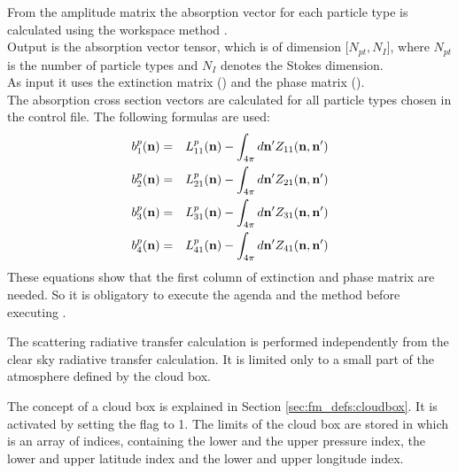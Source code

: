 From the amplitude matrix the absorption vector for each
particle type is calculated using the workspace method
.\\
Output is the absorption vector tensor, which is  of  dimension
[$N_{pt}, N_{I}$], where $N_{pt}$ is the number of particle
types  and $N_{I}$ denotes the Stokes dimension.\\
As input it uses the extinction
matrix () and the phase matrix
().\\
The absorption cross section vectors \SAbVec{} are
calculated for all particle types chosen in the control
file. The following formulas are used:
\begin{eqnarray}
  \label{eq:gen_abs_vector}
  b^p_1({\bf n}) &=&  L^p_{11}({\bf n}) - \int_{4\pi} d{\bf n'}
  Z_{11}({\bf n, n'})\\
  b^p_2({\bf n}) &=&  L^p_{21}({\bf n}) - \int_{4\pi} d{\bf n'}
  Z_{21}({\bf n, n'})\\
  b^p_3({\bf n}) &=&  L^p_{31}({\bf n}) - \int_{4\pi} d{\bf n'}
  Z_{31}({\bf n, n'})\\
  b^p_4({\bf n}) &=&  L^p_{41}({\bf n}) - \int_{4\pi} d{\bf n'}
  Z_{41}({\bf n, n'}) \\
\end{eqnarray}
These equations show that the first column of extinction and phase
matrix are needed. So it is obligatory to execute the agenda
 and the method
 before executing
. 



\label{sec:scattering:scat_meth_rt}

The scattering radiative transfer calculation is performed
independently from the clear sky radiative transfer calculation. It is
limited only to a small part of the atmosphere defined by the cloud box.

\label{sec:scattering:cloudbox}


The concept of a cloud box is explained in Section
\ref{sec:fm_defs:cloudbox}. It is activated by setting the flag
 to 1. The
limits of the cloud box are stored in 
which is an array of indices, containing the lower and the upper
pressure index, the lower and upper latitude index and the lower and
upper longitude index. 

